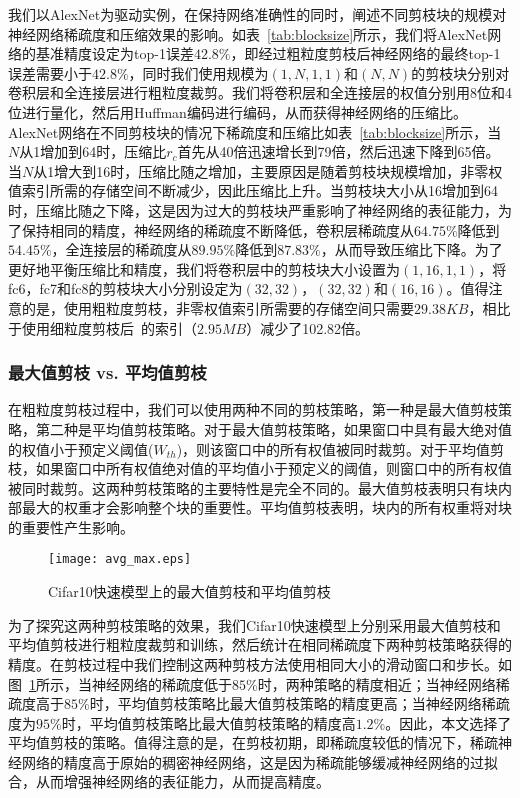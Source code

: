 我们以AlexNet为驱动实例，在保持网络准确性的同时，阐述不同剪枝块的规模对神经网络稀疏度和压缩效果的影响。如表~\ref{tab:blocksize}所示，我们将AlexNet网络的基准精度设定为top-1误差$42.8\%$，即经过粗粒度剪枝后神经网络的最终top-1误差需要小于$42.8\%$，同时我们使用规模为$(1,N,1,1)$和$(N,N)$的剪枝块分别对卷积层和全连接层进行粗粒度裁剪。我们将卷积层和全连接层的权值分别用8位和4位进行量化，然后用Huffman编码进行编码，从而获得神经网络的压缩比。
AlexNet网络在不同剪枝块的情况下稀疏度和压缩比如表~\ref{tab:blocksize}所示，当$N$从1增加到64时，压缩比$r_c$首先从40倍迅速增长到79倍，然后迅速下降到65倍。当$N$从1增大到16时，压缩比随之增加，主要原因是随着剪枝块规模增加，非零权值索引所需的存储空间不断减少，因此压缩比上升。当剪枝块大小从16增加到64时，压缩比随之下降，这是因为过大的剪枝块严重影响了神经网络的表征能力，为了保持相同的精度，神经网络的稀疏度不断降低，卷积层稀疏度从$64.75\%$降低到$54.45\%$，全连接层的稀疏度从$89.95\%$降低到$87.83\%$，从而导致压缩比下降。为了更好地平衡压缩比和精度，我们将卷积层中的剪枝块大小设置为$(1,16,1,1)$，将fc6，fc7和fc8的剪枝块大小分别设定为$(32,32)$，$(32,32)$和$(16,16)$。值得注意的是，使用粗粒度剪枝，非零权值索引所需要的存储空间只需要$29.38KB$，相比于使用细粒度剪枝后~\cite{han2015deep}的索引（$2.95MB$）减少了102.82倍。

\subsubsection{最大值剪枝 vs. 平均值剪枝}


在粗粒度剪枝过程中，我们可以使用两种不同的剪枝策略，第一种是最大值剪枝策略，第二种是平均值剪枝策略。对于最大值剪枝策略，如果窗口中具有最大绝对值的权值小于预定义阈值($W_{th}$)，则该窗口中的所有权值被同时裁剪。对于平均值剪枝，如果窗口中所有权值绝对值的平均值小于预定义的阈值，则窗口中的所有权值被同时裁剪。这两种剪枝策略的主要特性是完全不同的。最大值剪枝表明只有块内部最大的权重才会影响整个块的重要性。平均值剪枝表明，块内的所有权重将对块的重要性产生影响。

\begin{figure}[h]
  \centering
  \texttt{[image: avg\_max.eps]}
  \caption{Cifar10快速模型上的最大值剪枝和平均值剪枝}
  \label{fig:max_or_avg_pruning}
\end{figure}

为了探究这两种剪枝策略的效果，我们Cifar10快速模型上分别采用最大值剪枝和平均值剪枝进行粗粒度裁剪和训练，然后统计在相同稀疏度下两种剪枝策略获得的精度。在剪枝过程中我们控制这两种剪枝方法使用相同大小的滑动窗口和步长。如图~\ref{fig:max_or_avg_pruning}所示，当神经网络的稀疏度低于$85\%$时，两种策略的精度相近；当神经网络稀疏度高于$85\%$时，平均值剪枝策略比最大值剪枝策略的精度更高；当神经网络稀疏度为$95\%$时，平均值剪枝策略比最大值剪枝策略的精度高$1.2\%$。因此，本文选择了平均值剪枝的策略。值得注意的是，在剪枝初期，即稀疏度较低的情况下，稀疏神经网络的精度高于原始的稠密神经网络，这是因为稀疏能够缓减神经网络的过拟合，从而增强神经网络的表征能力，从而提高精度。

